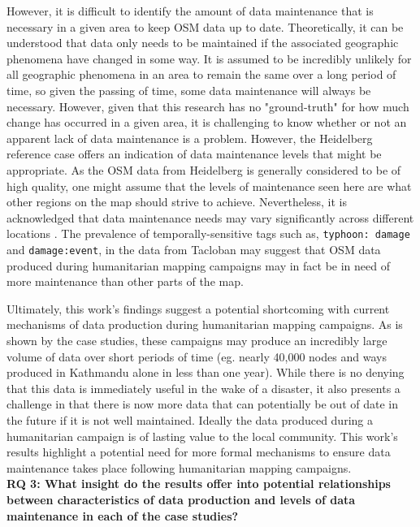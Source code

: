 However, it is difficult to identify the amount of data maintenance that is necessary in a given area to keep OSM data up to date. Theoretically, it can be understood that data only needs to be maintained if the associated geographic phenomena have changed in some way. It is assumed to be incredibly unlikely for all geographic phenomena in an area to remain the same over a long period of time, so given the passing of time, some data maintenance will always be necessary. However, given that this research has no "ground-truth" for how much change has occurred in a given area, it is challenging to know whether or not an apparent lack of data maintenance is a problem. However, the Heidelberg reference case offers an indication of data maintenance levels that might be appropriate. As the OSM data from Heidelberg is generally considered to be of high quality, one might assume that the levels of maintenance seen here are what other regions on the map should strive to achieve. Nevertheless, it is acknowledged that data maintenance needs may vary significantly across different locations \parencite{quattrone_work_2017}. The prevalence of temporally-sensitive tags such as, \texttt{typhoon: damage} and \texttt{damage:event}, in the data from Tacloban may suggest that OSM data produced during humanitarian mapping campaigns may in fact be in need of more maintenance than other parts of the map. 

Ultimately, this work's findings suggest a potential shortcoming with current mechanisms of data production during humanitarian mapping campaigns. As is shown by the case studies, these campaigns may produce an incredibly large volume of data over short periods of time (eg. nearly 40,000 nodes and ways produced in Kathmandu alone in less than one year). While there is no denying that this data is immediately useful in the wake of a disaster, it also presents a challenge in that there is now more data that can potentially be out of date in the future if it is not well maintained. Ideally the data produced during a humanitarian campaign is of lasting value to the local community. This work's results highlight a potential need for more formal mechanisms to ensure data maintenance takes place following humanitarian mapping campaigns.\\

\noindent\textbf{RQ 3: What insight do the results offer into potential relationships between characteristics of data production and levels of data maintenance in each of the case studies?}

